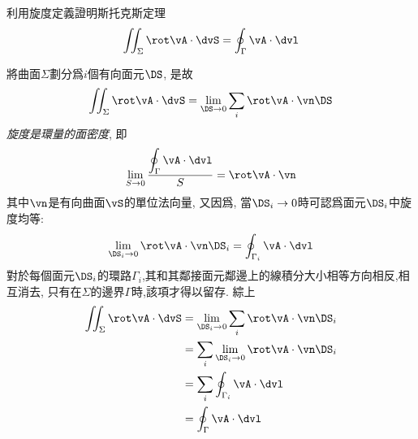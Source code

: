
\begin{problem}
利用旋度定義證明斯托克斯定理
$$\iint_\Sigma \rot \vA \cdot \dvS = \oint_\Gamma \vA \cdot \dvl$$
\end{problem}

\begin{solve}
    將曲面$\Sigma$劃分爲$i$個有向面元$\DS$, 是故
    \begin{equation}
        \iint_\Sigma \rot \vA \cdot \dvS = \lim_{\DS \to 0}\sum_i \rot \vA \cdot \vn \DS
    \end{equation}
    \emph{旋度是環量的面密度}, 即
    \begin{equation}
        \lim_{S\to 0} \frac{\displaystyle \oint_\Gamma \vA \cdot \dvl}{S} = \rot \vA \cdot \vn
    \end{equation}
    其中$\vn$是有向曲面$\vS$的單位法向量, 又因爲, 當$\DS_i \to 0$時可認爲面元$\DS_i$中旋度均等:
    $$\lim_{\DS_i \to 0}\rot\vA \cdot \vn\DS_i = \oint_{\Gamma_i} \vA \cdot \dvl$$
    對於每個面元$\DS_i$的環路$\Gamma_i$,其和其鄰接面元鄰邊上的線積分大小相等方向相反,相互消去, 只有在$\Sigma$的邊界$\Gamma$時,該項才得以留存.
    綜上
    \begin{align}
        \iint_\Sigma \rot \vA \cdot \dvS & = \lim_{\DS_i \to 0}\sum_i \rot \vA \cdot \vn \DS_i  \\
                                         & = \sum_i \lim_{\DS_i \to 0} \rot \vA \cdot \vn \DS_i \\
                                         & = \sum_i \oint_{\Gamma_i} \vA \cdot \dvl             \\
                                         & = \oint_{\Gamma} \vA \cdot \dvl
    \end{align}
\end{solve}